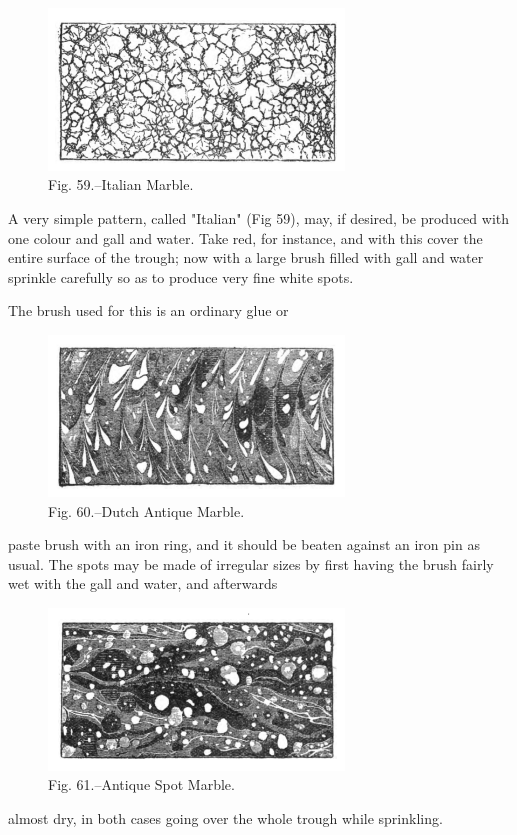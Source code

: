 \documentclass[twoside]{book}
\begin{document}
	\begin{figure}[h]
		\centering
		\includegraphics[width=0.7\textwidth]{Figures/_059.png}
		\caption*{Fig. 59.--Italian Marble.}
	\end{figure}

A very simple pattern, called "Italian" (Fig 59),
may, if desired, be produced with one colour and
gall and water. Take red, for instance, and with
this cover the entire surface of the trough; now
\pagebreak
with a large brush filled with gall and water
sprinkle carefully so as to produce very fine white
spots.

The brush used for this is an ordinary glue or
	\begin{figure}[h]
		\centering
		\includegraphics[width=0.7\textwidth]{Figures/_060.png}
		\caption*{Fig. 60.--Dutch Antique Marble.}
	\end{figure}
paste brush with an iron ring, and it should be
beaten against an iron pin as usual. The spots may
be made of irregular sizes by first having the brush
fairly wet with the gall and water, and afterwards
	\begin{figure}[h]
		\centering
		\includegraphics[width=0.7\textwidth]{Figures/_061.png}
		\caption*{Fig. 61.--Antique Spot Marble.}
	\end{figure}
almost dry, in both cases going over the whole
trough while sprinkling.
\end{document}

